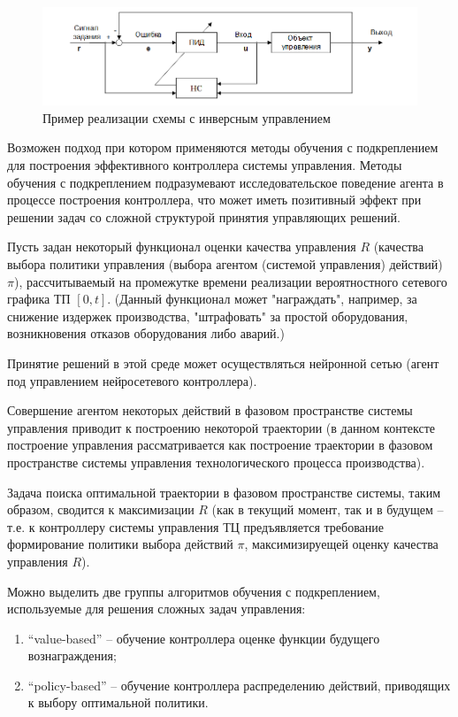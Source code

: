 \begin{figure}[H]
	\includegraphics[scale=0.8]{images/part7/chapter_enterprise/nncontrol_inverse.png}
	\caption{Пример реализации схемы с инверсным управлением}
	\label{fig:nncontrol_inverse}
\end{figure}

Возможен подход при котором применяются методы обучения с подкреплением для построения эффективного контроллера системы управления. Методы обучения с подкреплением подразумевают исследовательское поведение агента в процессе построения контроллера, что может иметь позитивный эффект при решении задач со сложной структурой принятия управляющих решений.

Пусть задан некоторый функционал оценки качества управления $R$ (качества выбора политики управления (выбора агентом (системой управления) действий) $\pi$), рассчитываемый на промежутке времени реализации вероятностного сетевого графика ТП $[0,t]$. (Данный функционал может "награждать", например, за снижение издержек производства, "штрафовать" за простой оборудования, возникновения отказов оборудования либо аварий.)

Принятие решений в этой среде может осуществляться нейронной сетью (агент под управлением нейросетевого контроллера).

Совершение агентом некоторых действий в фазовом пространстве системы управления приводит к построению некоторой траектории (в данном контексте построение управления рассматривается как построение траектории в фазовом пространстве системы управления технологического процесса производства).


Задача поиска оптимальной траектории в фазовом пространстве системы, таким образом, сводится к максимизации $R$ (как в текущий момент, так и в будущем – т.е. к контроллеру системы управления ТЦ предъявляется требование формирование политики выбора действий $\pi$, максимизируещей оценку качества управления $R$).

Можно выделить две группы алгоритмов обучения с подкреплением, используемые для решения сложных задач управления:

\begin{enumerate}
    \item ``value-based'' – обучение контроллера оценке функции будущего вознаграждения;
    \item ``policy-based'' – обучение контроллера распределению действий, приводящих к выбору оптимальной политики.
\end{enumerate}


